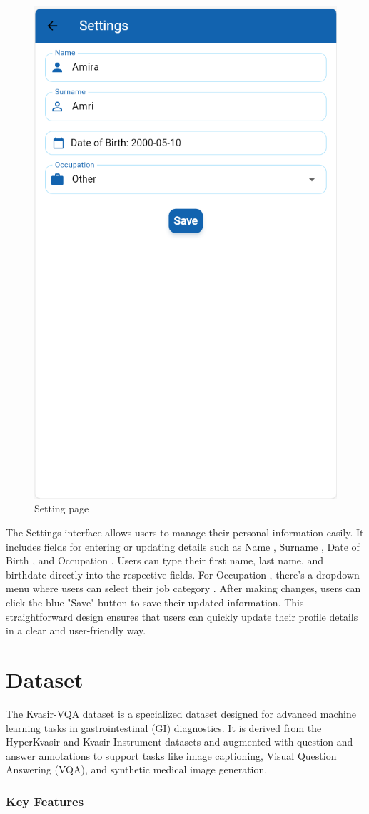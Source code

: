 \documentclass[12pt,a4paper]{report}
\begin{document}
\begin{figure}[H]
    \centering
    \includegraphics[width=0.5\linewidth]{set1.png}
    \caption{Setting page}
    \label{fig:enter-label}
\end{figure}
The Settings interface allows users to manage their personal information easily. It includes fields for entering or updating details such as Name , Surname , Date of Birth , and Occupation . Users can type their first name, last name, and birthdate directly into the respective fields. For Occupation , there's a dropdown menu where users can select their job category . After making changes, users can click the blue "Save" button to save their updated information. This straightforward design ensures that users can quickly update their profile details in a clear and user-friendly way.

\section{Dataset}
The Kvasir-VQA dataset is a specialized dataset designed for advanced machine learning tasks in gastrointestinal (GI) diagnostics. It is derived from the HyperKvasir and Kvasir-Instrument datasets and augmented with question-and-answer annotations to support tasks like image captioning, Visual Question Answering (VQA), and synthetic medical image generation.

\subsubsection{Key Features}
\end{document}
